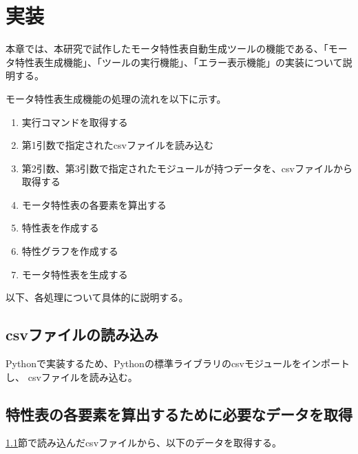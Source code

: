\chapter{実装}\label{cha:Implementation}

本章では、本研究で試作したモータ特性表自動生成ツールの機能である、「モータ特性表生成機能」、「ツールの実行機能」、「エラー表示機能」の実装について説明する。




モータ特性表生成機能の処理の流れを以下に示す。
\begin{enumerate}
    \item 実行コマンドを取得する
    \item 第1引数で指定されたcsvファイルを読み込む
    \item 第2引数、第3引数で指定されたモジュールが持つデータを、csvファイルから取得する
    \item モータ特性表の各要素を算出する
    \item 特性表を作成する
    \item 特性グラフを作成する
    \item モータ特性表を生成する
\end{enumerate}

以下、各処理について具体的に説明する。

\section{csvファイルの読み込み}\label{csvfairu}
Pythonで実装するため、Pythonの標準ライブラリのcsvモジュールをインポートし、
csvファイルを読み込む。

\section{特性表の各要素を算出するために必要なデータを取得}\label{syutoku_data}
\ref{csvfairu}節で読み込んだcsvファイルから、以下のデータを取得する。

